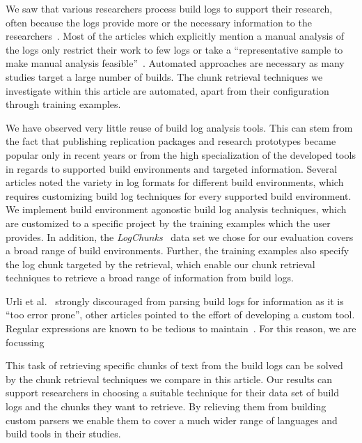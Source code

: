 We saw that various researchers process build logs to support their
research, often because the logs provide more or the necessary information
to the researchers~\cite{ren2018automated}.
Most of the articles which explicitly mention a manual analysis of
the logs only restrict their work to few logs or take a
``representative sample to make manual analysis
feasible''~\cite{zolfagharinia2017not}.
Automated approaches are necessary as many studies target a large
number of builds.
The chunk retrieval techniques we investigate within this article are
automated, apart from their configuration through training examples.

We have observed very little reuse of build log analysis tools.
This can stem from the fact that publishing replication packages and
research prototypes became popular only in recent years or from the
high specialization of the developed tools in regards to supported
build environments and targeted information.
Several articles noted the variety in log formats for different build
environments, which requires customizing build log techniques for
every supported build environment.
We implement build environment agonostic build log analysis
techniques, which are customized to a specific project by
the training examples which the user provides.
In addition, the \emph{LogChunks}~\cite{brandt2020logchunks}
data set we chose for our evaluation covers a broad range of build
environments.
Further, the training examples also specify the log chunk targeted by the
retrieval, which enable our chunk retrieval techniques to retrieve a
broad range of information from build logs.

Urli et al.~\cite{urli2018design} strongly discouraged from parsing
build logs for information as it is ``too error prone'', other
articles pointed to the effort of developing a custom tool.
Regular expressions are known to be tedious to
maintain~\cite{michael2019regexes}.
For this reason, we are focussing %


This task of retrieving specific chunks of text from the
build logs can be solved by the chunk retrieval techniques we compare
in this article.
Our results can support researchers in choosing a
suitable technique for their data set of build logs and the chunks
they want to retrieve.
By relieving them from building custom parsers
we enable them to cover a much wider range of languages and build
tools in their studies.


